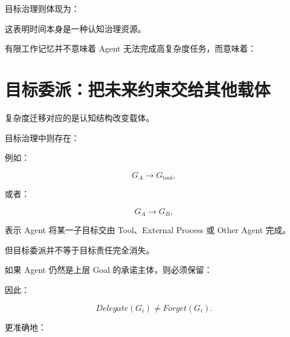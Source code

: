 目标治理则体现为：

\begin{statementbox}
\centering
{}
\end{statementbox}

这表明时间本身是一种认知治理资源。

有限工作记忆并不意味着 Agent 无法完成高复杂度任务，而意味着：

\begin{statementbox}
\centering
{}
\end{statementbox}


\section{目标委派：把未来约束交给其他载体}

复杂度迁移对应的是认知结构改变载体。

目标治理中则存在：

\begin{statementbox}
\centering
{}
\end{statementbox}

例如：

\[
G_A
\rightarrow
G_{\mathrm{tool}},
\]

或者：

\[
G_A
\rightarrow
G_B,
\]

表示 Agent 将某一子目标交由 Tool、External Process 或 Other Agent 完成。

但目标委派并不等于目标责任完全消失。

如果 Agent 仍然是上层 Goal 的承诺主体，则必须保留：

\begin{statementbox}
\centering
{}
\end{statementbox}

因此：

\[
Delegate(G_i)
\neq
Forget(G_i).
\]

更准确地：

\begin{statementbox}
\centering
{}
\end{statementbox}

